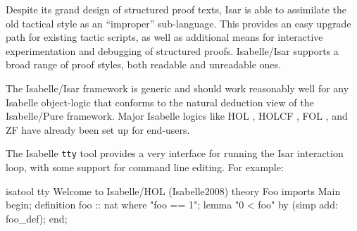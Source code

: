 \begin{isabellebody}
\begin{isamarkuptext}
  Despite its grand design of structured proof texts, Isar is able to
  assimilate the old tactical style as an ``improper'' sub-language.
  This provides an easy upgrade path for existing tactic scripts, as
  well as additional means for interactive experimentation and
  debugging of structured proofs.  Isabelle/Isar supports a broad
  range of proof styles, both readable and unreadable ones.

  \medskip The Isabelle/Isar framework is generic and should work
  reasonably well for any Isabelle object-logic that conforms to the
  natural deduction view of the Isabelle/Pure framework.  Major
  Isabelle logics like HOL \cite{isabelle-HOL}, HOLCF
  \cite{MuellerNvOS99}, FOL \cite{isabelle-logics}, and ZF
  \cite{isabelle-ZF} have already been set up for end-users.%
\end{isamarkuptext}%
\isamarkuptrue%
%
\isamarkuptrue%
%
\isamarkuptrue%
%
\begin{isamarkuptext}%
The Isabelle \texttt{tty} tool provides a very interface for running
  the Isar interaction loop, with some support for command line
  editing.  For example:
\begin{ttbox}
isatool tty\medskip
{\out Welcome to Isabelle/HOL (Isabelle2008)}\medskip
theory Foo imports Main begin;
definition foo :: nat where "foo == 1";
lemma "0 < foo" by (simp add: foo_def);
end;
\end{ttbox}


\end{isamarkuptext}
\end{isabellebody}
